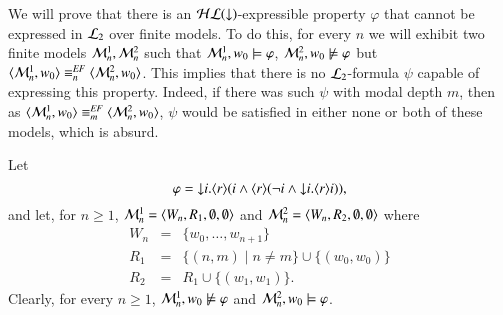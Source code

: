 \begin{pf}
We will prove that there is an $\mathcal{HL}({\downarrow})$-expressible property
$\varphi$ that cannot be expressed in $\mathcal{L}_2$ over finite models.
To do this, for every $n$ we will exhibit two finite models
$\mathcal{M}^1_n,\mathcal{M}^2_n$ such that $\mathcal{M}^1_n,w_0\models\varphi$,
$\mathcal{M}^2_n,w_0\not\models\varphi$ but
$\langle \mathcal{M}^1_n,w_0 \rangle\equiv^{\mathit{EF}}_n\langle \mathcal{M}^2_n,w_0 \rangle$. This implies
that there is no $\mathcal{L}_2$-formula $\psi$ capable of expressing this
property. Indeed, if there was such $\psi$ with modal depth $m$,
then as $\langle \mathcal{M}^1_n,w_0 \rangle\equiv^{\mathit{EF}}_m\langle \mathcal{M}^2_n,w_0 \rangle$,  $\psi$
would be satisfied in either none or both of these models, which is
absurd.

Let
\[
 \varphi =
{\downarrow} i. \langle r \rangle(i \land \langle r \rangle(\lnot i \land {\downarrow} i.
\langle r \rangle i)),
\]
and let, for $n\geq 1$, $\mathcal{M}^1_n = \langle W_n, R_1, \emptyset,
\emptyset \rangle$ and $\mathcal{M}^2_n = \langle W_n, R_2, \emptyset, \emptyset \rangle$
where
\begin{eqnarray*}
W_n&=&\{w_0, \dots, w_{n+1}\}\\
R_1&=&\{(n,m)\mid n \neq m\} \cup \{(w_0,w_0)\}\\
R_2&=&R_1 \cup \{(w_1, w_1)\}.
\end{eqnarray*}
%
Clearly, for every $n \geq 1$, $\mathcal{M}^1_n, w_0 \not\models \varphi$ and
$\mathcal{M}^2_n, w_0 \models \varphi$.

\begin{figure}
\begin{center}
\hspace{1cm}
\end{center}
\end{figure}
\end{pf}
